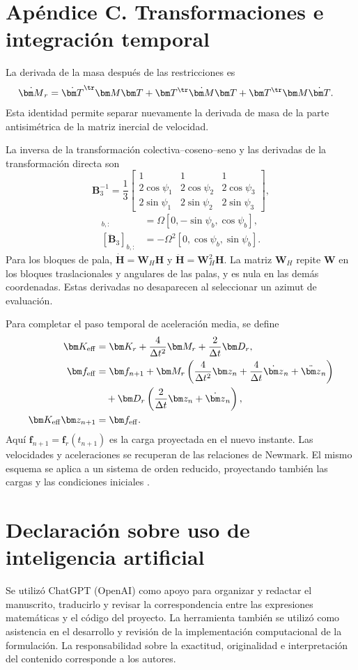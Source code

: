 \section{Apéndice C. Transformaciones e integración temporal}
La derivada de la masa después de las restricciones es
\begin{align}
\dot{\bm M}_r={}&\dot{\bm T}^\tr\bm M\bm T+\bm T^\tr\dot{\bm M}\bm T
+\bm T^\tr\bm M\dot{\bm T}.
\end{align}
Esta identidad permite separar nuevamente la derivada de masa de la parte antisimétrica de la matriz inercial de velocidad.

La inversa de la transformación colectiva--coseno--seno y las derivadas de la transformación directa son
\begin{equation}
\bm B_3^{-1}=\frac13\begin{bmatrix}
1&1&1\\2\cos\psi_1&2\cos\psi_2&2\cos\psi_3\\
2\sin\psi_1&2\sin\psi_2&2\sin\psi_3
\end{bmatrix},
\end{equation}
\begin{align}
[\dot{\bm B}_3]_{b,:}&=\Omega[0,-\sin\psi_b,\cos\psi_b],\nonumber\\
[\ddot{\bm B}_3]_{b,:}&=-\Omega^2[0,\cos\psi_b,\sin\psi_b].
\end{align}
Para los bloques de pala, $\dot{\bm H}=\bm W_H\bm H$ y $\ddot{\bm H}=\bm W_H^2\bm H$. La matriz $\bm W_H$ repite $\bm W$ en los bloques traslacionales y angulares de las palas, y es nula en las demás coordenadas. Estas derivadas no desaparecen al seleccionar un azimut de evaluación.

Para completar el paso temporal de aceleración media, se define
\begin{align}
\bm K_{\rm eff}&=\bm K_r+\frac4{\Delta t^2}\bm M_r+\frac2{\Delta t}\bm D_r,\nonumber\\
\bm f_{\rm eff}&=\bm f_{n+1}
+\bm M_r\left(\frac4{\Delta t^2}\bm z_n+\frac4{\Delta t}\dot{\bm z}_n+\ddot{\bm z}_n\right)\nonumber\\
&\quad+\bm D_r\left(\frac2{\Delta t}\bm z_n+\dot{\bm z}_n\right),\nonumber\\
\bm K_{\rm eff}\bm z_{n+1}&=\bm f_{\rm eff}.
\end{align}
Aquí $\bm f_{n+1}=\bm f_r(t_{n+1})$ es la carga proyectada en el nuevo instante. Las velocidades y aceleraciones se recuperan de las relaciones de Newmark. El mismo esquema se aplica a un sistema de orden reducido, proyectando también las cargas y las condiciones iniciales \citep{newmark1971}.

\section{Declaración sobre uso de inteligencia artificial}
Se utilizó ChatGPT (OpenAI) como apoyo para organizar y redactar el manuscrito, traducirlo y revisar la correspondencia entre las expresiones matemáticas y el código del proyecto. La herramienta también se utilizó como asistencia en el desarrollo y revisión de la implementación computacional de la formulación. La responsabilidad sobre la exactitud, originalidad e interpretación del contenido corresponde a los autores.
